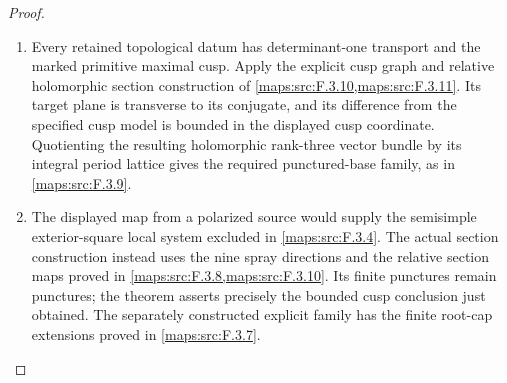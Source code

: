 \documentclass[11pt,a4paper]{article}
\theoremstyle{definition}
\begin{document}
\begin{proof}
\begin{enumerate}[label=\arabic*.]
\item Every retained topological datum has determinant-one transport
and the marked primitive maximal cusp. Apply the explicit cusp graph
and relative holomorphic section construction of
\cref{maps:src:F.3.10,maps:src:F.3.11}. Its target plane is transverse
to its conjugate, and its difference from the specified cusp model is
bounded in the displayed cusp coordinate. Quotienting the resulting
holomorphic rank-three vector bundle by its integral period lattice
gives the required punctured-base family, as in \cref{maps:src:F.3.9}.
\item The displayed map from a polarized source would supply the
semisimple exterior-square local system excluded in
\cref{maps:src:F.3.4}. The actual section construction instead uses
the nine spray directions and the relative section maps proved in
\cref{maps:src:F.3.8,maps:src:F.3.10}. Its finite punctures remain
punctures; the theorem asserts precisely the bounded cusp conclusion
just obtained. The separately constructed explicit family has the
finite root-cap extensions proved in \cref{maps:src:F.3.7}.
\end{enumerate}
\end{proof}
\end{document}
